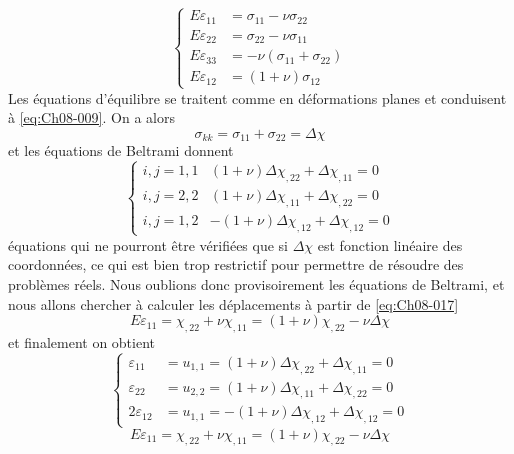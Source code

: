 \begin{equation}
    \begin{cases}
        E \varepsilon_{11} & = \sigma_{11}-\nu\sigma_{22}\\
        E \varepsilon_{22} & = \sigma_{22}-\nu\sigma_{11}\\
        E \varepsilon_{33} & = -\nu (\sigma_{11}+\sigma_{22})\\
        E \varepsilon_{12} & = (1+\nu)\sigma_{12}
    \end{cases}
    \label{eq:Ch08-017}
\end{equation}
Les équations d'équilibre se traitent comme en déformations planes et conduisent à \eqref{eq:Ch08-009}. 
On a alors 
\begin{equation}
  \sigma_{kk}=\sigma_{11}+\sigma_{22}=\Delta\chi
\label{eq:Ch08-018}
\end{equation}
et les équations de Beltrami donnent 
\begin{equation}
  \begin{cases}
    i,j=1,1  &  (1+\nu) \Delta\chi_{,22}+\Delta\chi_{,11} = 0\\
    i,j=2,2  &  (1+\nu) \Delta\chi_{,11}+\Delta\chi_{,22} = 0\\
    i,j=1,2  & -(1+\nu) \Delta\chi_{,12}+\Delta\chi_{,12} = 0
  \end{cases}
\label{eq:Ch08-019}
\end{equation}
équations qui ne pourront être vérifiées que si $\Delta\chi$ est fonction linéaire des coordonnées, ce qui est bien trop restrictif pour permettre de résoudre des problèmes réels.
Nous oublions donc provisoirement les équations de Beltrami, et nous allons chercher à calculer les déplacements à partir de \eqref{eq:Ch08-017} 
\begin{equation*}
  E\varepsilon_{11}=\chi_{,22}+\nu\chi_{,11}=(1+\nu)\chi_{,22}-\nu\Delta\chi
\end{equation*}
et finalement on obtient 
\begin{equation}
  \begin{cases}
    \varepsilon_{11}   &  = u_{1,1} = (1+\nu) \Delta\chi_{,22}+\Delta\chi_{,11} = 0\\
    \varepsilon_{22}   &  = u_{2,2} =   (1+\nu) \Delta\chi_{,11}+\Delta\chi_{,22} = 0\\
    2\varepsilon_{12}  &  = u_{1,1} =  -(1+\nu) \Delta\chi_{,12}+\Delta\chi_{,12} = 0
  \end{cases}
\label{eq:Ch08-020}
\end{equation}
\begin{equation*}
  E\varepsilon_{11}=\chi_{,22}+\nu\chi_{,11}=(1+\nu)\chi_{,22}-\nu\Delta\chi
\label{eq:Ch08-021}
\end{equation*}
